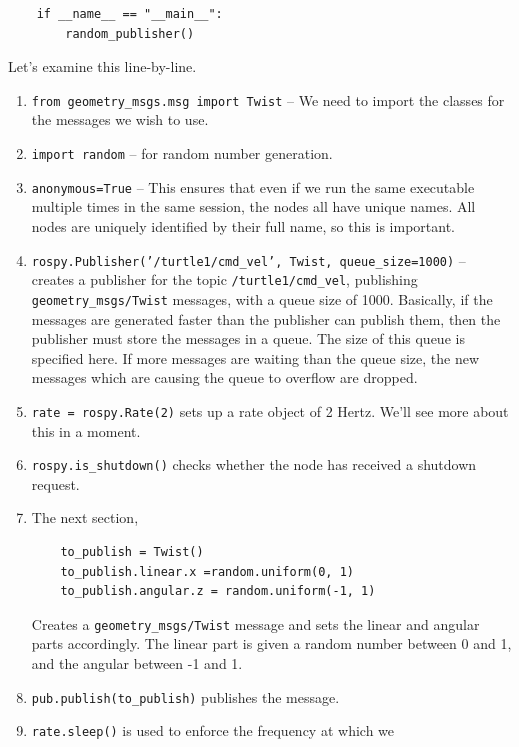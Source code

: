 \documentclass{article}
\begin{document}
\begin{enumerate}
\begin{verbatim}
    if __name__ == "__main__":
        random_publisher()
        \end{verbatim}
        Let's examine this line-by-line.
        \begin{enumerate}
            \item \texttt{from geometry_msgs.msg import Twist} -- We need 
            to import the classes for the messages we wish to use.
            \item \texttt{import random} -- for random number generation.
            \item \texttt{anonymous=True} -- This ensures that even if 
            we run the same executable multiple times in the same session, the nodes 
            all have unique names. All nodes are uniquely identified by their full name,
            so this is important.
            \item \texttt{rospy.Publisher('/turtle1/cmd_vel', Twist, queue_size=1000)}
            -- creates a publisher for the topic \texttt{/turtle1/cmd\_vel}, publishing 
            \texttt{geometry\_msgs/Twist} messages, with a queue size of 1000. Basically, if the 
            messages are generated faster than the publisher can publish them, then the publisher
            must store the messages in a queue. The size of this queue is specified here. If more 
            messages are waiting than the queue size, the new messages which are causing the queue
            to overflow are dropped.
            \item \texttt{rate = rospy.Rate(2)} sets up a rate object of 2 Hertz. We'll
            see more about this in a moment.
            \item \texttt{rospy.is_shutdown()} checks whether the node has received a 
            shutdown request.
            \item The next section,
            \begin{verbatim}
    to_publish = Twist()
    to_publish.linear.x =random.uniform(0, 1)
    to_publish.angular.z = random.uniform(-1, 1)
            \end{verbatim}
            Creates a \texttt{geometry\_msgs/Twist} message and sets the linear and angular parts
            accordingly. The linear part is given a random number between 0 and 1, and the angular
            between -1 and 1.
            \item \texttt{pub.publish(to_publish)} publishes the message.
            \item \texttt{rate.sleep()} is used to enforce the frequency at which we

\end{enumerate}
\end{enumerate}
\end{document}

